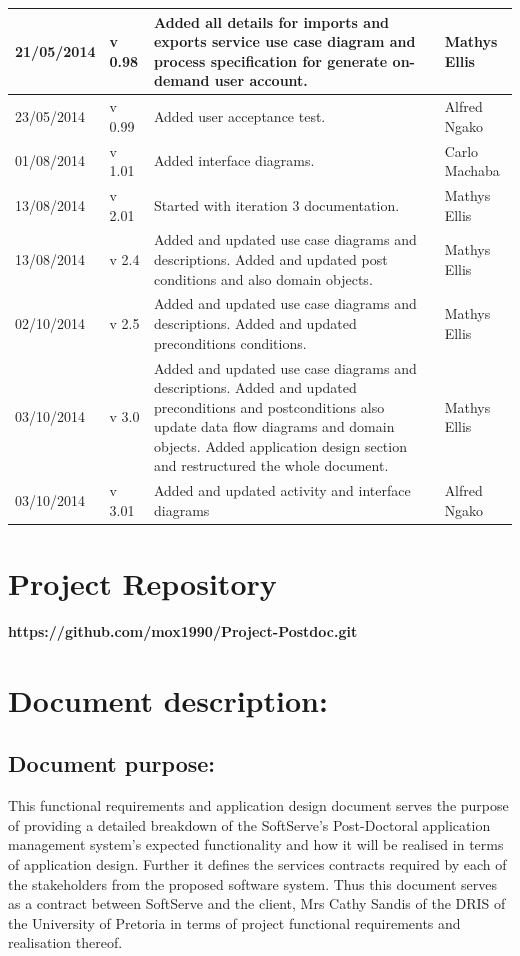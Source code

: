 \documentclass[12pt]{article}
\newcommand{\repo}{https://github.com/mox1990/Project-Postdoc.git}
\begin{document}
\begin{center}
\begin{longtable}{|l|p{1.4cm}|p{8cm}|p{2.8cm}|}
\hline
21/05/2014 & v 0.98 & Added all details for imports and exports service use case diagram and process specification for generate on-demand user account. & Mathys Ellis \\
\hline
23/05/2014 & v 0.99 & Added user acceptance test. & Alfred Ngako \\
\hline
01/08/2014 & v 1.01 & Added interface diagrams. & Carlo Machaba \\
\hline
13/08/2014 & v 2.01 & Started with iteration 3 documentation. & Mathys Ellis \\
\hline
13/08/2014 & v 2.4 & Added and updated use case diagrams and descriptions. Added and updated post conditions and also domain objects. & Mathys Ellis \\
\hline
02/10/2014 & v 2.5 & Added and updated use case diagrams and descriptions. Added and updated preconditions conditions. & Mathys Ellis \\
\hline
03/10/2014 & v 3.0 & Added and updated use case diagrams and descriptions. Added and updated preconditions and postconditions also update data flow diagrams and domain objects. Added application design section and restructured the whole document. & Mathys Ellis \\
\hline
03/10/2014 & v 3.01 & Added and updated activity and interface diagrams & Alfred Ngako \\
\hline

\end{longtable}
\end{center}
\newpage
\tableofcontents

\listoffigures
\newpage
\section{Project Repository}
\textbf{\repo}
\newpage
\section{Document description:}

\subsection{Document purpose:}
\vspace{0.2in}
This functional requirements and application design document serves the purpose of providing a detailed breakdown of the SoftServe's Post-Doctoral application management system's expected functionality and how it will be realised in terms of application design. Further it defines the services contracts required by each of the stakeholders from the proposed software system. Thus this document serves as a contract between SoftServe and the client, Mrs Cathy Sandis of the DRIS of the University of Pretoria in terms of project functional requirements and realisation thereof.
\end{document}
